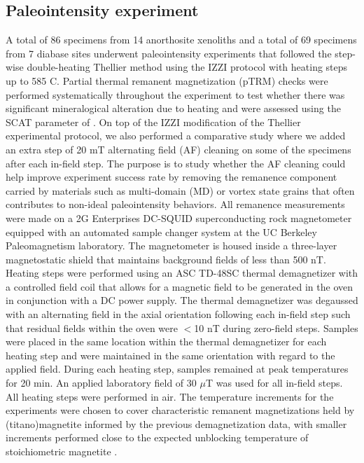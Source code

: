 \documentclass[9pt,twocolumn,twoside,lineno]{pnas-new}
\begin{document}
{\subsection*{Paleointensity experiment}
A total of 86 specimens from 14 anorthosite xenoliths and a total of 69 specimens from 7 diabase sites underwent paleointensity experiments that followed the step-wise double-heating Thellier method \cite{Thellier1959a} using the IZZI protocol \cite{Tauxe2004a} with heating steps up to 585 \textdegree C. Partial thermal remanent magnetization (pTRM) checks were performed systematically throughout the experiment to test whether there was significant mineralogical alteration due to heating and were assessed using the SCAT parameter of \cite{Shaar2013a}. On top of the IZZI modification of the Thellier experimental protocol, we also performed a comparative study where we added an extra step of 20 mT alternating field (AF) cleaning on some of the specimens after each in-field step. The purpose is to study whether the AF cleaning could help improve experiment success rate by removing the remanence component carried by materials such as multi-domain (MD) or vortex state grains that often contributes to non-ideal paleointensity behaviors. All remanence measurements were made on a 2G Enterprises DC-SQUID superconducting rock magnetometer equipped with an automated sample changer system at the UC Berkeley Paleomagnetism laboratory. The magnetometer is housed inside a three-layer magnetostatic shield that maintains background fields of less than 500 nT. Heating steps were performed using an ASC TD-48SC thermal demagnetizer with a controlled field coil that allows for a magnetic field to be generated in the oven in conjunction with a DC power supply. The thermal demagnetizer was degaussed with an alternating field in the axial orientation following each in-field step such that residual fields within the oven were $<$10 nT during zero-field steps. Samples were placed in the same location within the thermal demagnetizer for each heating step and were maintained in the same orientation with regard to the applied field. During each heating step, samples remained at peak temperatures for 20 min. An applied laboratory field of 30 $\mu$T was used for all in-field steps. All heating steps were performed in air. The temperature increments for the experiments were chosen to cover characteristic remanent magnetizations held by (titano)magnetite informed by the previous demagnetization data, with smaller increments performed close to the expected unblocking temperature of stoichiometric magnetite \cite{Zhang2021b}. 

}
\end{document}
